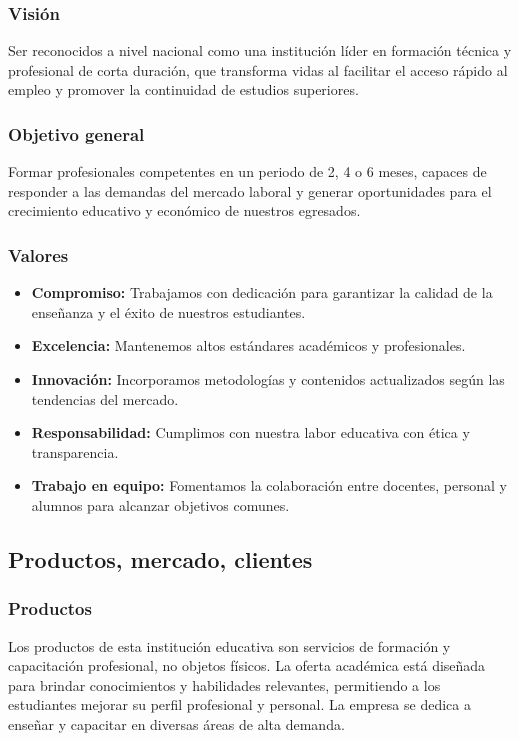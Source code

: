 \subsubsection{Visión}
Ser reconocidos a nivel nacional como una institución líder en formación técnica y profesional de corta duración, que transforma vidas al facilitar el acceso rápido al empleo y promover la continuidad de estudios superiores.

\subsubsection{Objetivo general}
Formar profesionales competentes en un periodo de 2, 4 o 6 meses, capaces de responder a las demandas del mercado laboral y generar oportunidades para el crecimiento educativo y económico de nuestros egresados.

\subsubsection{Valores}
\begin{itemize}
	\item \textbf{Compromiso:} Trabajamos con dedicación para garantizar la calidad de la enseñanza y el éxito de nuestros estudiantes.
	\item \textbf{Excelencia:} Mantenemos altos estándares académicos y profesionales.
	\item \textbf{Innovación:} Incorporamos metodologías y contenidos actualizados según las tendencias del mercado.
	\item \textbf{Responsabilidad:} Cumplimos con nuestra labor educativa con ética y transparencia.
	\item \textbf{Trabajo en equipo:} Fomentamos la colaboración entre docentes, personal y alumnos para alcanzar objetivos comunes.
\end{itemize}



\subsection{Productos, mercado, clientes}
\subsubsection{Productos}
Los productos de esta institución educativa son servicios de formación y capacitación profesional, no objetos físicos. La oferta académica está diseñada para brindar conocimientos y habilidades relevantes, permitiendo a los estudiantes mejorar su perfil profesional y personal. La empresa se dedica a enseñar y capacitar en diversas áreas de alta demanda.

